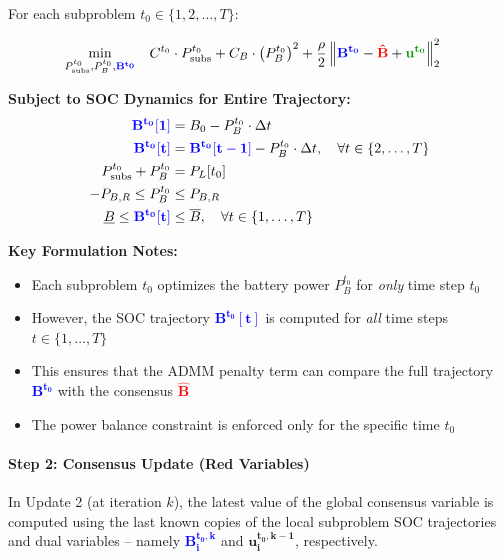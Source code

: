 For each subproblem $t_0 \in \{1, 2, \ldots, T\}$:

\begin{align}
\min_{P_{\text{subs}}^{t_0}, P_{B}^{t_0}, \textcolor{blue}{\mathbf{B^{t_0}}}} \quad & C^{t_0} \cdot P_{\text{subs}}^{t_0} + C_B \cdot \left(P_{B}^{t_0}\right)^2 + \frac{\rho}{2} \left\| \textcolor{blue}{\mathbf{B^{t_0}}} - \textcolor{red}{\mathbf{\hat{B}}} + \textcolor{green!60!black}{\mathbf{u^{t_0}}} \right\|_2^2
\end{align}

\textbf{Subject to SOC Dynamics for Entire Trajectory:}
\begin{align}
\textcolor{blue}{\mathbf{B^{t_0}[1]}} &= B_0 - P_{B}^{t_0} \cdot \Delta t \\
\textcolor{blue}{\mathbf{B^{t_0}[t]}} &= \textcolor{blue}{\mathbf{B^{t_0}[t-1]}} - P_{B}^{t_0} \cdot \Delta t, \quad \forall t \in \{2, \ldots, T\} \\
P_{\text{subs}}^{t_0} + P_{B}^{t_0} &= P_L[t_0] \\
-P_{B,R} \leq P_{B}^{t_0} &\leq P_{B,R} \\
\underline{B} \leq \textcolor{blue}{\mathbf{B^{t_0}[t]}} &\leq \overline{B}, \quad \forall t \in \{1, \ldots, T\}
\end{align}

\textbf{Key Formulation Notes:}
\begin{itemize}
    \item Each subproblem $t_0$ optimizes the battery power $P_{B}^{t_0}$ for \textit{only} time step $t_0$
    \item However, the SOC trajectory \textcolor{blue}{$\mathbf{B^{t_0}[t]}$} is computed for \textit{all} time steps $t \in \{1, \ldots, T\}$
    \item This ensures that the ADMM penalty term can compare the full trajectory \textcolor{blue}{$\mathbf{B^{t_0}}$} with the consensus \textcolor{red}{$\mathbf{\hat{B}}$}
    \item The power balance constraint is enforced only for the specific time $t_0$
\end{itemize}

\paragraph{Step 2: Consensus Update (Red Variables)}

In Update 2 (at iteration $k$), the latest value of the global consensus variable is computed using the last known copies of the local subproblem SOC trajectories and dual variables -- namely \textcolor{blue}{$\mathbf{B_i^{t_0, k}}$} and \textcolor{green!60!black}{$\mathbf{u_i^{t_0, k-1}}$}, respectively.

